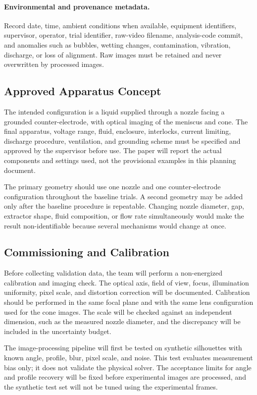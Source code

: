 \paragraph{Environmental and provenance metadata.} Record date, time, ambient conditions when available, equipment identifiers, supervisor, operator, trial identifier, raw-video filename, analysis-code commit, and anomalies such as bubbles, wetting changes, contamination, vibration, discharge, or loss of alignment. Raw images must be retained and never overwritten by processed images.

\subsection{Approved Apparatus Concept}

The intended configuration is a liquid supplied through a nozzle facing a grounded counter-electrode, with optical imaging of the meniscus and cone. The final apparatus, voltage range, fluid, enclosure, interlocks, current limiting, discharge procedure, ventilation, and grounding scheme must be specified and approved by the supervisor before use. The paper will report the actual components and settings used, not the provisional examples in this planning document.

The primary geometry should use one nozzle and one counter-electrode configuration throughout the baseline trials. A second geometry may be added only after the baseline procedure is repeatable. Changing nozzle diameter, gap, extractor shape, fluid composition, or flow rate simultaneously would make the result non-identifiable because several mechanisms would change at once.

\subsection{Commissioning and Calibration}

Before collecting validation data, the team will perform a non-energized calibration and imaging check. The optical axis, field of view, focus, illumination uniformity, pixel scale, and distortion correction will be documented. Calibration should be performed in the same focal plane and with the same lens configuration used for the cone images. The scale will be checked against an independent dimension, such as the measured nozzle diameter, and the discrepancy will be included in the uncertainty budget.

The image-processing pipeline will first be tested on synthetic silhouettes with known angle, profile, blur, pixel scale, and noise. This test evaluates measurement bias only; it does not validate the physical solver. The acceptance limits for angle and profile recovery will be fixed before experimental images are processed, and the synthetic test set will not be tuned using the experimental frames.

